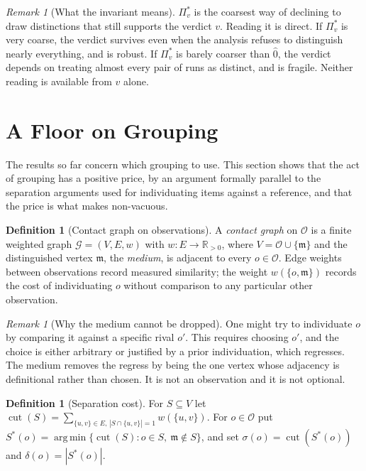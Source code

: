 \documentclass[11pt,a4paper]{article}
\theoremstyle{definition}
\newtheorem{definition}[theorem]{Definition}
\theoremstyle{remark}
\newtheorem{remark}[theorem]{Remark}
\newcommand{\Gph}{\mathcal{G}}
\newcommand{\wt}{w}
\newcommand{\med}{\mathfrak{m}}
\newcommand{\cut}{\operatorname{cut}}
\newcommand{\sep}{\sigma}
\newcommand{\dep}{\delta}
\newcommand{\Obs}{\mathcal{O}}               %
\newcommand{\Part}{\Pi}                      %
\DeclareMathOperator*{\argmin}{arg\,min}
\begin{document}
\begin{remark}[What the invariant means]\label{rem:invariant-reading}
$\Part^{\ast}_v$ is the coarsest way of declining to draw distinctions
that still supports the verdict $v$. Reading it is direct. If
$\Part^{\ast}_v$ is very coarse, the verdict survives even when the
analysis refuses to distinguish nearly everything, and is robust. If
$\Part^{\ast}_v$ is barely coarser than $\hat{0}$, the verdict depends on
treating almost every pair of runs as distinct, and is fragile. Neither
reading is available from $v$ alone.
\end{remark}

\section{A Floor on Grouping}
\label{sec:floor}

The results so far concern which grouping to use. This section shows that
the act of grouping has a positive price, by an argument formally
parallel to the separation arguments used for individuating items against
a reference, and that the price is what makes 
non-vacuous.

\begin{definition}[Contact graph on observations]\label{def:contact}
A \emph{contact graph} on $\Obs$ is a finite weighted graph
$\Gph = (V,E,\wt)$ with $\wt : E \to \mathbb{R}_{>0}$, where
$V = \Obs \cup \{\med\}$ and the distinguished vertex $\med$, the
\emph{medium}, is adjacent to every $o \in \Obs$. Edge weights between
observations record measured similarity; the weight $\wt(\{o,\med\})$
records the cost of individuating $o$ without comparison to any
particular other observation.
\end{definition}

\begin{remark}[Why the medium cannot be dropped]\label{rem:medium}
One might try to individuate $o$ by comparing it against a specific rival
$o'$. This requires choosing $o'$, and the choice is either arbitrary or
justified by a prior individuation, which regresses. The medium removes
the regress by being the one vertex whose adjacency is definitional
rather than chosen. It is not an observation and it is not optional.
\end{remark}

\begin{definition}[Separation cost]\label{def:sep}
For $S \subseteq V$ let
$\cut(S) = \sum_{\{u,v\}\in E,\,|S\cap\{u,v\}|=1} \wt(\{u,v\})$. For
$o \in \Obs$ put
$S^{\ast}(o) = \argmin\{\cut(S) : o \in S,\ \med \notin S\}$, and set
$\sep(o) = \cut(S^{\ast}(o))$ and $\dep(o) = |S^{\ast}(o)|$.
\end{definition}
\end{document}
